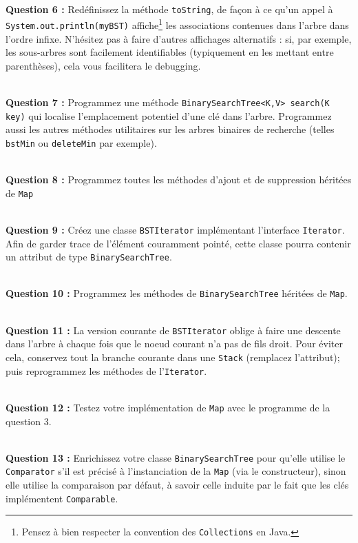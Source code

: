 \documentclass[iutinfo,a4paper,nocorrections,10pt]{ustl-tdtp}
\begin{document}
~\\ \textbf{Question 6 :} Redéfinissez la méthode \texttt{toString}, de façon à ce qu'un appel à \texttt{System.out.println(myBST)} affiche\footnote{Pensez à bien respecter la convention des \texttt{Collections} en Java.} les associations contenues dans l'arbre dans l'ordre infixe. N'hésitez pas à faire d'autres affichages alternatifs : si, par exemple, les sous-arbres sont facilement identifiables (typiquement en les mettant entre parenthèses), cela vous facilitera le debugging.

~\\ \textbf{Question 7 :} Programmez une méthode \texttt{BinarySearchTree<K,V> search(K key)} qui localise l'emplacement potentiel d'une clé dans l'arbre. Programmez aussi les autres méthodes utilitaires sur les arbres binaires de recherche (telles \texttt{bstMin} ou \texttt{deleteMin} par exemple).
 
~\\ \textbf{Question 8 :} Programmez toutes les méthodes d'ajout et de suppression héritées de \texttt{Map}

~\\ \textbf{Question 9 :} Créez une classe \texttt{BSTIterator}
implémentant l'interface \texttt{Iterator}. Afin de garder trace de
l'élément couramment pointé, cette classe pourra contenir un attribut
de type \texttt{BinarySearchTree}. 

~\\ \textbf{Question 10 :} Programmez les méthodes de
\texttt{BinarySearchTree} héritées de \texttt{Map}.

~\\ \textbf{Question 11 :} La version courante de \texttt{BSTIterator} oblige à faire une descente dans l'arbre à chaque fois que le noeud courant
n'a pas de fils droit. Pour éviter cela, conservez tout la branche
courante dans une \texttt{Stack} (remplacez l'attribut); puis
reprogrammez les méthodes de l'\texttt{Iterator}.

~\\ \textbf{Question 12 :} Testez votre implémentation de \texttt{Map}
avec le programme de la question 3.

~\\ \textbf{Question 13 :} Enrichissez votre classe
\texttt{BinarySearchTree} pour qu'elle utilise le \texttt{Comparator}
s'il est précisé à l'instanciation de la \texttt{Map} (via le constructeur), sinon elle
utilise la comparaison par défaut, à savoir celle induite par le fait que les clés implémentent \texttt{Comparable}.
\end{document}
